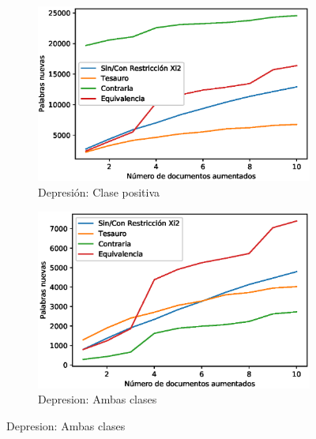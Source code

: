 \begin{figure}[hbt!]
    \begin{subfigure}[b]{0.5\textwidth}
        \includegraphics[width=\textwidth]{sections/figures/pos_plot.eps}
        \caption{Depresión: Clase positiva}
    \end{subfigure}
    \hfill
    \begin{subfigure}[b]{0.5\textwidth}
        \includegraphics[width=\textwidth]{sections/figures/both_plot_1.eps}
        \caption{Depresion: Ambas clases}
    \end{subfigure}
    \hfill
    

\end{figure}
